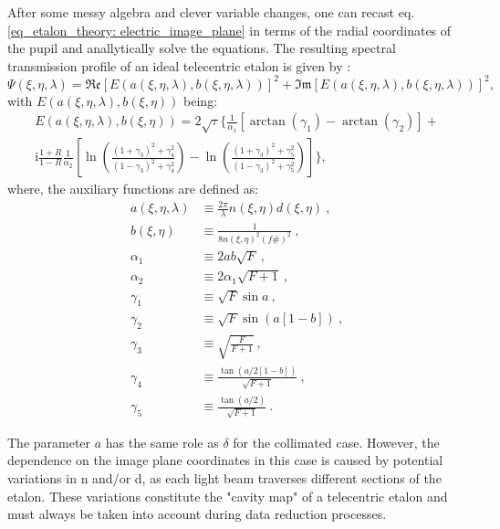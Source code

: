 After some messy algebra and clever variable changes, one can recast eq. \eqref{eq_etalon_theory: electric_image_plane} in terms of the radial coordinates of the pupil and anallytically solve the equations. The resulting spectral transmission profile of an ideal telecentric etalon  is given by \citep{franIV}:
\begin{equation}
\Psi \left(\xi, \eta, \lambda \right) =  \mathfrak{Re}\left[E(a\left(\xi, \eta, \lambda \right), b\left(\xi, \eta, \lambda \right)) \right] ^2 + \mathfrak{Im}\left[E(a\left(\xi, \eta, \lambda \right), b\left(\xi, \eta, \lambda \right)) \right] ^2 ,
\label{eq_etalon_theory: Tel_first}
\end{equation}
with $E(a\left(\xi, \eta, \lambda \right), b\left(\xi, \eta \right))$ being:
\begin{multline}
E(a\left(\xi, \eta, \lambda \right), b\left(\xi, \eta \right)) = 2\sqrt{\tau}\Biggl\{ \frac{1}{\alpha_1}\left[\arctan(\gamma _ 1) - \arctan(\gamma_2)\right] + \\
\mathrm{i} \frac{1+R}{1-R} \frac{1}{\alpha_2}\left[\ln \left(\frac{(1 + \gamma _ 3) ^2 + \gamma _ 4 ^2}{(1 - \gamma _ 3) ^2 + \gamma _ 4 ^2} \right) - \ln \left(\frac{(1 + \gamma_ 3) ^2 + \gamma _ 5 ^ 2}{(1 - \gamma _ 3) ^2 + \gamma _ 5 ^2} \right)\right]\Biggr\},  
\end{multline}
where, the auxiliary functions are defined as:
\begin{equation}
\begin{split}
a\left(\xi, \eta, \lambda \right) &\equiv \frac{2 \pi}{\lambda}n\left(\xi, \eta\right)d\left(\xi, \eta\right) \ , \\
b\left(\xi, \eta\right) &\equiv \frac{1}{8n\left(\xi, \eta\right)^2(f\#) ^2}\ ,  \\
\alpha _ 1 &\equiv 2ab\sqrt{F}\ ,  \\
\alpha _ 2 &\equiv 2\alpha_ 1\sqrt{F + 1}\ ,  \\
\gamma _ 1 &\equiv \sqrt{F} \sin a\ ,  \\
\gamma _ 2 &\equiv \sqrt{F} \sin (a[1 - b])\ ,  \\
\gamma _ 3 &\equiv \sqrt{\frac{F}{F + 1}} \ ,  \\
\gamma _ 4 &\equiv \frac{\tan \left( a/2 [1 - b] \right)}{\sqrt{F + 1}}\ ,  \\
\gamma _ 5 &\equiv \frac{\tan (a/2)}{\sqrt{F + 1}}\ .
\end{split}
\end{equation}

The parameter $a$ has the same role as $\delta$ for the collimated case. However, the dependence on the image plane coordinates in this case is caused by potential variations in n and/or d, as each light beam traverses different sections of the etalon. These variations constitute the "cavity map" of a telecentric etalon and must always be taken into account during data reduction processes.

